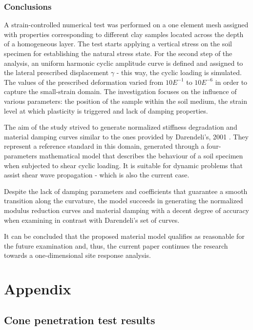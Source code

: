 \documentclass[12pt,a4paper]{report}
\begin{document}
\newpage
\section{Conclusions}
A strain-controlled numerical test was performed on a one element mesh assigned with properties corresponding to different clay samples located across the depth of a homogeneous layer. The test starts applying a vertical stress on the soil specimen for establishing the natural stress state. For the second step of the analysis, an uniform harmonic cyclic amplitude curve is defined and assigned to the lateral prescribed displacement $\gamma$ - this way, the cyclic loading is simulated. The values of the prescribed deformation varied from $10E^{-1}$ to $10E^{-6}$ in order to capture the small-strain domain. The investigation focuses on the influence of various parameters: the position of the sample within the soil medium, the strain level at which plasticity is triggered and lack of damping properties.

 The aim of the study strived to generate normalized stiffness degradation and material damping curves similar to the ones provided by Darendeli's, 2001 \cite{darendeli2001development}. They represent a reference standard in this domain, generated through a four-parameters mathematical model that describes the behaviour of a soil specimen when subjected to shear cyclic loading. It is suitable for dynamic problems that assist shear wave propagation - which is also the current case.

Despite the lack of damping parameters and coefficients that guarantee a smooth transition along the curvature, the model succeeds in generating the normalized modulus reduction curves and material damping with a decent degree of accuracy when examining in contrast with Darendeli's set of curves.  

It can be concluded that the proposed material model qualifies as reasonable for the future examination and, thus, the current paper continues the research towards a one-dimensional site response analysis. 




\newpage
\appendix
{}
\part{Appendix}
\chapter{Cone penetration test results} \label{App:AppendixA}
\end{document}
